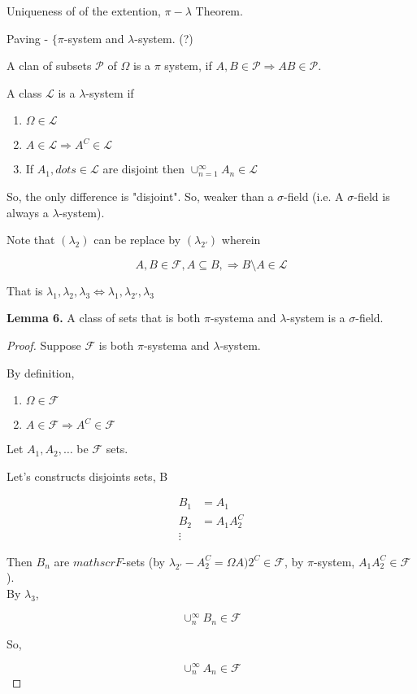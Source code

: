 \documentclass[11pt,fleqn]{book} %
\begin{document}
Uniqueness of of the extention, $\pi-\lambda$ Theorem.

	Paving - $\{ \pi$-system and $\lambda$-system. (?)

	A clan of subsets $\mathscr{P}$ of $\Omega$ is a $\pi$ system, if $A, B \in \mathscr{P} \Rightarrow AB \in \mathscr{P}$. 

	A class $\mathscr{L}$ is a $\lambda$-system if 
		\begin{enumerate}
			\item $\Omega \in \mathscr{L}$ 
			\item $A \in \mathscr{L} \Rightarrow A^C \in \mathscr{L}$
			\item If $A_1, dots \in \mathscr{L} $ are disjoint then $\cup^\infty_{n=1} A_n \in \mathscr{L}$
		\end{enumerate}

	So, the only difference is "disjoint". So, weaker than a $\sigma$-field (i.e. A $\sigma$-field is always a $\lambda$-system).

Note that $(\lambda_2)$ can be replace by $(\lambda_{2\prime})$ wherein

$$A, B \in \mathscr{F}, A \subseteq B, \Rightarrow B\setminus A \in \mathscr{L} $$

That is $\lambda_1, \lambda_2, \lambda_3 \Leftrightarrow \lambda_1, \lambda_{2\prime}, \lambda_3$

\textbf{Lemma 6.} A class of sets that is both $\pi$-systema and $\lambda$-system is a $\sigma$-field. 

\begin{proof}
	Suppose $\mathscr{F}$ is both $\pi$-systema and $\lambda$-system.

By definition, 
\begin{enumerate}
			\item $\Omega \in \mathscr{F}$ 
			\item $A \in \mathscr{F} \Rightarrow A^C \in \mathscr{F}$
		\end{enumerate}

		Let $A_1, A_2, \dots$ be $\mathscr{F}$ sets. 

		Let's constructs disjoints sets, B

		\begin{align*}
			B_1 &= A_1\\
			B_2 &= A_1A_2^C\\
			\vdots
		\end{align*}

		Then $B_n$ are $mathscr{F}$-sets (by $\lambda_{2\prime} - A_2^C = \Omega A)2^C \in \mathscr{F}$, by $\pi$-system, $A_1A_2^C \in \mathscr{F}$ ).\\

		By $\lambda_3$, 

		$$\cup_n^\infty B_n \in \mathscr{F} $$

		So, 

		$$\cup_n^\infty A_n \in \mathscr{F} $$

\end{proof}
\end{document}
